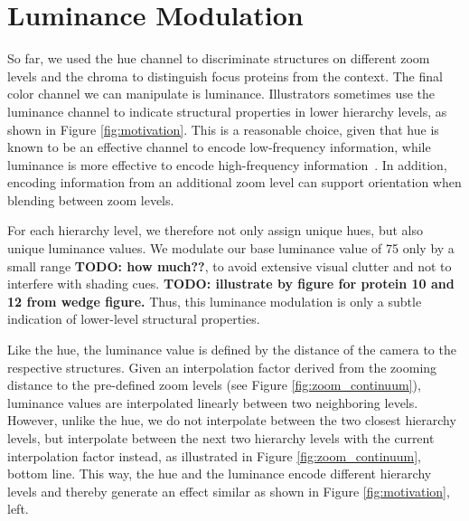 \documentclass{egpubl}
\begin{document}
	\section{Luminance Modulation}
	\label{sec:luminance}
	
	So far, we used the hue channel to discriminate structures on different zoom levels and the chroma to distinguish focus proteins from the context. 
	The final color channel we can manipulate is luminance. 
	Illustrators sometimes use the luminance channel to indicate structural properties in lower hierarchy levels, as shown in Figure \ref{fig:motivation}. 
	This is a reasonable choice, given that hue is known to be an effective channel to encode low-frequency information, while luminance is more effective to encode high-frequency information~\cite{bergman1995rule}. 
	In addition, encoding information from an additional zoom level can support orientation when blending between zoom levels. 
	
	
	For each hierarchy level, we therefore not only assign unique hues, but also unique luminance values. 
	We modulate our base luminance value of 75 only by a small range \textbf{TODO: how much??}, to avoid extensive visual clutter and not to interfere with shading cues. 
	\textbf{TODO: illustrate by figure for protein 10 and 12 from wedge figure. } 
	Thus, this luminance modulation is only a subtle indication of lower-level structural properties. 
	
	Like the hue, the luminance value is defined by the distance of the camera to the respective structures. 
	Given an interpolation factor derived from the zooming distance to the pre-defined zoom levels (see Figure \ref{fig:zoom_continuum}), luminance values are interpolated linearly between two neighboring levels. 
	However, unlike the hue, we do not interpolate between the two closest hierarchy levels, but interpolate between the next two hierarchy levels with the current interpolation factor instead, as illustrated in Figure \ref{fig:zoom_continuum}, bottom line. 
	This way, the hue and the luminance encode different hierarchy levels and thereby generate an effect similar as shown in Figure \ref{fig:motivation}, left. 
				
\end{document}
